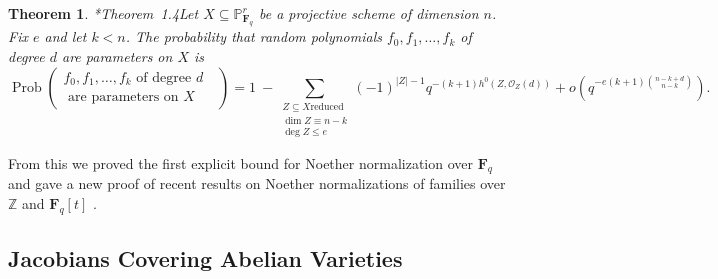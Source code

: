\documentclass[11pt,reqno]{amsart}
\newtheorem{theorem}[lemma]{Theorem}
\newtheorem{cor}[lemma]{Corollary}
\theoremstyle{remark}
\newcommand{\Prob}{\operatorname{Prob}}
\newcommand{\fF}{\mathbf F}
\renewcommand{\O}{\mathcal{O}}
\renewcommand{\P}{\mathbb{P}}
\newcommand{\Z}{\mathbb{Z}}
\begin{document}
\begin{theorem}\cite{bruceErman-sop}*{Theorem~1.4}\label{thm:main finite field}
Let $X\subseteq \P^r_{\fF_q}$ be a projective scheme of dimension $n$. Fix $e$ and let $k<n$. The probability that random polynomials $f_0,f_1,\dots,f_k$ of degree $d$ are parameters on $X$ is
\[
\Prob\left(\begin{matrix}f_0,f_1,\dots,f_{k} \text{ of degree $d$ } \\ \text{ are parameters on $X$}\end{matrix}\right) = 1 \ - 
\sum_{\begin{smallmatrix}Z\subseteq X \text{reduced} \\ \dim Z \equiv n-k\\ \deg Z \leq e  \end{smallmatrix}}(-1)^{|Z|-1}q^{-(k+1)h^0(Z,\O_Z(d))}+ o\left(q^{-e(k+1)\binom{n-k+d}{n-k}}\right).
\]
\end{theorem}



From this we proved the first explicit bound for Noether normalization over $\fF_{q}$ and gave a new proof of recent results on Noether normalizations of families over $\Z$ and $\fF_{q}[t]$ \cite{gabberLiuLorenzini15, cmbpt}.



\subsection{Jacobians Covering Abelian Varieties}
\end{document}
